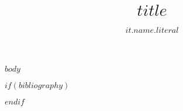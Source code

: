 \documentclass[$if(fontsize)$
$fontsize$,
$endif$
$if(papersize)$
$papersize$paper,
$endif$
$for(classoption)$
$classoption$$sep$,
$endfor$]{thesis-umich}
\title{$title$}
\author{$it.name.literal$}
\begin{document}
$body$

$if(bibliography)$


$endif$
\end{document}
